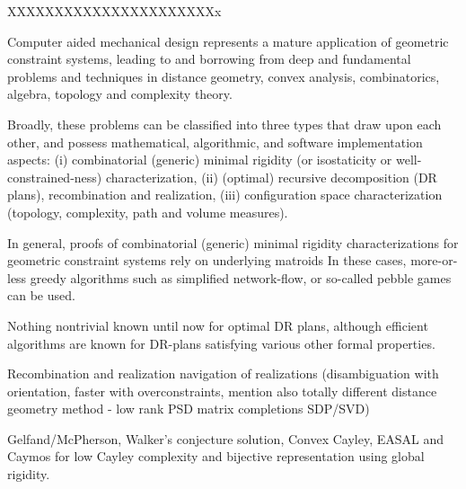 XXXXXXXXXXXXXXXXXXXXXXx

Computer aided mechanical design represents a mature application of geometric constraint systems,  leading to and borrowing 
from deep and fundamental problems and techniques in distance geometry, convex analysis, combinatorics, algebra, topology 
and complexity theory.

Broadly, these problems can be classified into three types that draw upon each other, and possess mathematical, algorithmic, 
and software implementation aspects: (i) combinatorial (generic) minimal rigidity (or isostaticity or well-constrained-ness) 
characterization, (ii) (optimal) recursive decomposition (DR plans), recombination and realization, (iii) configuration space 
characterization (topology, complexity, path and volume measures).

In general, proofs of combinatorial (generic) minimal rigidity characterizations for geometric constraint systems rely on 
underlying matroids  In these cases, more-or-less greedy algorithms such as simplified network-flow, 
or so-called pebble games can be used.

Nothing nontrivial known until now for optimal DR plans, although efficient algorithms are known for DR-plans satisfying 
various other formal properties.

Recombination and realization navigation of realizations (disambiguation with orientation, faster with overconstraints, mention 
also totally different distance geometry method - low rank PSD matrix completions SDP/SVD)

Gelfand/McPherson, Walker's conjecture solution, Convex Cayley, EASAL and Caymos for low Cayley complexity and bijective 
representation using global rigidity.
